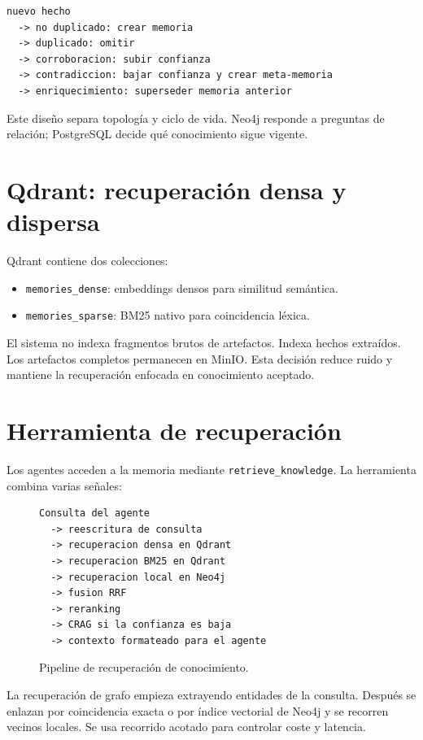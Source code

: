 \begin{verbatim}
nuevo hecho
  -> no duplicado: crear memoria
  -> duplicado: omitir
  -> corroboracion: subir confianza
  -> contradiccion: bajar confianza y crear meta-memoria
  -> enriquecimiento: superseder memoria anterior
\end{verbatim}

Este diseño separa topología y ciclo de vida. Neo4j responde a preguntas de
relación; PostgreSQL decide qué conocimiento sigue vigente.

\section{Qdrant: recuperación densa y dispersa}

Qdrant contiene dos colecciones:

\begin{itemize}
\item \texttt{memories\_dense}: embeddings densos para similitud semántica.
\item \texttt{memories\_sparse}: BM25 nativo para coincidencia léxica.
\end{itemize}

El sistema no indexa fragmentos brutos de artefactos. Indexa hechos extraídos.
Los artefactos completos permanecen en MinIO. Esta decisión reduce ruido y
mantiene la recuperación enfocada en conocimiento aceptado.

\section{Herramienta de recuperación}

Los agentes acceden a la memoria mediante \texttt{retrieve\_knowledge}. La
herramienta combina varias señales:

\begin{figure}[H]
\centering
\begin{verbatim}
Consulta del agente
  -> reescritura de consulta
  -> recuperacion densa en Qdrant
  -> recuperacion BM25 en Qdrant
  -> recuperacion local en Neo4j
  -> fusion RRF
  -> reranking
  -> CRAG si la confianza es baja
  -> contexto formateado para el agente
\end{verbatim}
\caption{Pipeline de recuperación de conocimiento.}
\end{figure}

La recuperación de grafo empieza extrayendo entidades de la consulta. Después se
enlazan por coincidencia exacta o por índice vectorial de Neo4j y se recorren
vecinos locales. Se usa recorrido acotado para controlar coste y latencia.

